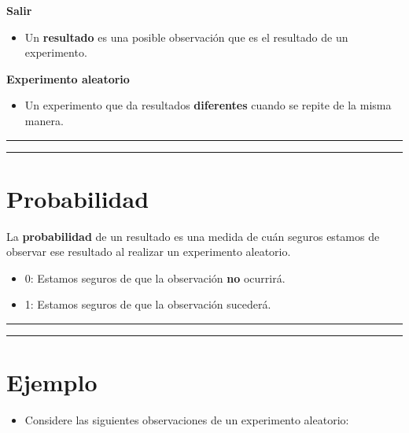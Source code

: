 \documentclass[
]{book}
\providecommand{\tightlist}{%
  \setlength{\itemsep}{0pt}\setlength{\parskip}{0pt}}
\begin{document}
\textbf{Salir}

\begin{itemize}
\tightlist
\item
  Un \textbf{resultado} es una posible observación que es el resultado de un experimento.
\end{itemize}

\textbf{Experimento aleatorio}

\begin{itemize}
\tightlist
\item
  Un experimento que da resultados \textbf{diferentes} cuando se repite de la misma manera.
\end{itemize}

\begin{center}\rule{0.5\linewidth}{0.5pt}\end{center}

\begin{center}\rule{0.5\linewidth}{0.5pt}\end{center}

\hypertarget{probabilidad-1}{%
\section{Probabilidad}\label{probabilidad-1}}

La \textbf{probabilidad} de un resultado es una medida de cuán seguros estamos de observar ese resultado al realizar un experimento aleatorio.

\begin{itemize}
\item
  0: Estamos seguros de que la observación \textbf{no} ocurrirá.
\item
  1: Estamos seguros de que la observación sucederá.
\end{itemize}

\begin{center}\rule{0.5\linewidth}{0.5pt}\end{center}

\begin{center}\rule{0.5\linewidth}{0.5pt}\end{center}

\hypertarget{ejemplo-3}{%
\section{Ejemplo}\label{ejemplo-3}}

\begin{itemize}
\tightlist
\item
  Considere las siguientes observaciones de un experimento aleatorio:
\end{itemize}
\end{document}
